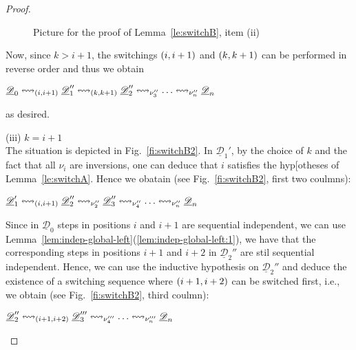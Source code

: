 \documentclass[a4paper,UKenglish,cleveref,pdftex,thm-restate,numberwithinsect,anonymous]{lipics}
\newcommand{\dder}[1]{\mathscr{#1}}
\newcommand{\der}[1]{\underline{\dder{#1}}}
\newcommand{\shift}[1]{\ensuremath{\mathrel{{\leftrightsquigarrow}_{#1}}}}
\begin{document}
\begin{proof}
\begin{figure}
  \caption{Picture for the proof of Lemma~\ref{le:switchB}, item (ii)}
  \label{fi:switchB1}
\end{figure}

  
  Now, since $k>i+1$, the switchings $\transp{i}$ and $\transp{k}$ can
  be performed in reverse order and thus we obtain
  \begin{center}
    $\der{D}_0 \shift{\transp{i}} \der{D}_1'' \shift{\transp{k}}
    \der{D}_2'' \shift{\nu_3''} \ldots \shift{\nu_n''} \der{D}_n$
  \end{center}
  as desired.

  \bigskip
  \noindent
  (iii) $k = i+1$\\
  The situation is depicted in Fig.~\ref{fi:switchB2}. In
  $\der{D}_1'$, by the choice of $k$ and the fact that all $\nu_i$ are
  inversions, one can deduce that $i$ satisfies the hyp[otheses of
  Lemma~\ref{le:switchA}. Hence we obatain (see Fig.~\ref{fi:switchB2}, first two coulmns):
  \begin{center}
    $\der{D}_1' \shift{\transp{i}} \der{D}_2'' \shift{\nu_2''}
    \der{D}_3'' \shift{\nu_4''} \ldots \shift{\nu_n''} \der{D}_n$
  \end{center}

  Since in $\der{D}_0$ steps in positions $i$ and $i+1$ are sequential
  independent, we can use
  Lemma~\ref{lem:indep-global-left}(\ref{lem:indep-global-left:1}), we have that the corresponding steps in positions
  $i+1$ and $i+2$ in $\der{D}_2''$ are stil sequential
  independent. Hence, we can use the inductive hypothesis on
  $\der{D}_2''$ and deduce the existence of a switching sequence where
  $\transp{i+1}[i+2]$ can be switched first, i.e., we obtain (see
  Fig.~\ref{fi:switchB2}, third coulmn):
  \begin{center}
    $\der{D}_2'' \shift{\transp{i+1}[i+2]}
    \der{D}_3''' \shift{\nu_4'''} \ldots \shift{\nu_n'''} \der{D}_n$
  \end{center}
  

\end{proof}
\end{document}
